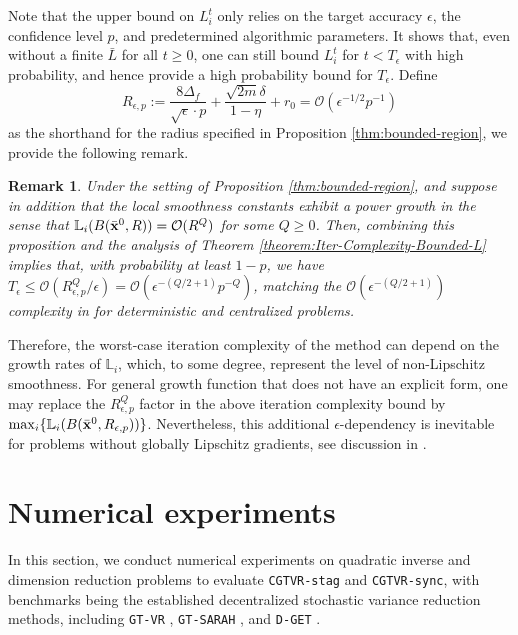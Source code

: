 \documentclass{article}
\newtheorem{remark}[theorem]{Remark}
\begin{document}
Note that the upper bound on $L_i^t$ only relies on the target accuracy $\epsilon$, the confidence level $p$, and predetermined algorithmic parameters. It shows that, even without a finite $\bar{L}$ for all $t\geq0$, one can still bound $L^t_i$ for $t<T_\epsilon$ with high probability, and hence provide a high probability bound for $T_\epsilon$.  Define $$R_{\epsilon,p}:=\frac{8\Delta_f}{\sqrt{\epsilon}\cdot p} + \frac{\sqrt{2m}\delta}{1-\eta}+r_0 = \mathcal{O}(\epsilon^{-1/2}p^{-1})$$
as the shorthand for the radius specified in Proposition \ref{thm:bounded-region}, we provide the following remark. 
\begin{remark}\label{remark:poly}
    Under the setting of Proposition \ref{thm:bounded-region}, and suppose in addition that the local smoothness constants exhibit a power growth in the sense that  $\mathbb{L}_i(B(\bar{\bf x}^0,R)) = \mathcal{O}(R^Q)$ for some $Q\geq0$. Then, combining this proposition and the analysis of Theorem \ref{theorem:Iter-Complexity-Bounded-L} implies that, with probability at least $1-p$, we have $T_\epsilon\leq\mathcal{O}(R^Q_{\epsilon,p}/\epsilon) = \mathcal{O}(\epsilon^{-(Q/2+1)}p^{-Q})$, matching the $\mathcal{O}(\epsilon^{-(Q/2+1)})$ complexity in \cite{zhang2024first} for deterministic and centralized problems.
\end{remark} 
Therefore, the worst-case iteration complexity of the method can depend on the growth rates of $\mathbb{L}_i$, which, to some degree, represent the level of non-Lipschitz smoothness. For general growth function that does not have an explicit form, one may replace the $R_{\epsilon,p}^Q$ factor in the above iteration complexity bound by $\max_i\{\mathbb{L}_i(B(\bar{\bf x}^0,R_{\epsilon,p}))\}$. Nevertheless, this additional $\epsilon$-dependency is inevitable for problems without globally Lipschitz gradients, see discussion in \cite{zhang2025stochastic}.

 




\section{Numerical experiments}  
\label{section:numerical}

In this section, we conduct numerical experiments on quadratic inverse and dimension reduction problems to evaluate \texttt{CGTVR-stag} and \texttt{CGTVR-sync}, with benchmarks being the established decentralized stochastic variance reduction methods, including \texttt{GT-VR} \cite{jiang2022distributed}, \texttt{GT-SARAH} \cite{xin2022fast}, and \texttt{D-GET} \cite{sun2020improving}.  \vspace{0.2cm}
\end{document}
